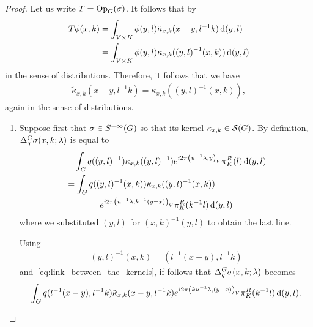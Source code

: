 \begin{proof}
    Let us write $T = \mathrm{Op}_{G} (\sigma)$.
    It follows that by
    \begin{align*}
        T \phi(x, k)
        &= \int_{V \times K} \phi(y, l) {\tilde \kappa}_{x, k}(x - y, l^{-1} k) \,\mathrm{d} (y, l)\\
        &= \int_{V \times K} \phi(y, l) {\kappa}_{x, k}({(y, l)}^{-1} (x, k)) \,\mathrm{d} (y, l)
    \end{align*}
    in the sense of distributions.
    Therefore, it follows that we have
    \begin{align}
        {\tilde \kappa}_{x, k}(x - y, l^{-1} k) =
        {\kappa}_{x, k}({(y, l)}^{-1} (x, k)),
        \label{eq:link_between_the_kernels}
    \end{align}
    again in the sense of distributions.

    \begin{enumerate}
        \item
            Suppose first that $\sigma \in {S^{-\infty} (G)}$ so that its kernel $\kappa_{x, k} \in {\mathcal{S} (G)}$.
            By definition, ${\Delta^{G}_{q}} \sigma(x, k; \lambda)$ is equal to
            \begin{align*}
                &\quad \int_G q((y, l)^{-1}) \kappa_{x, k}((y, l)^{-1}) e^{i 2 \pi {\left(u^{-1} \lambda, y\right)_{V}}} \pi^R_{K}(l) \,\mathrm{d} (y, l)\\
                &= \int_G q((y, l)^{-1} (x, k)) \kappa_{x, k}((y, l)^{-1} (x, k))\\
                &\qquad \qquad e^{i 2 \pi {\left(u^{-1} \lambda, k^{-1} (y - x)\right)_{V}}} \pi^R_{K}(k^{-1} l) \,\mathrm{d} (y, l)
            \end{align*}
            where we substituted $(y, l)$ for $(x, k)^{-1} (y, l)$ to obtain the last line.

            Using
            \begin{align*}
                (y, l)^{-1} (x, k) = (l^{-1}(x - y), l^{-1} k)
            \end{align*}
            and~\eqref{eq:link_between_the_kernels},
            if follows that ${\Delta^{G}_{q}} \sigma(x, k; \lambda)$ becomes
            \begin{align*}
                \int_G q(l^{-1}(x - y), l^{-1} k) \tilde \kappa_{x, k}(x - y, l^{-1} k) e^{i 2 \pi {\left(k u^{-1} \lambda, (y - x)\right)_{V}}} \pi^R_{K}(k^{-1} l) \,\mathrm{d} (y, l).
            \end{align*}


\end{enumerate}
\end{proof}
